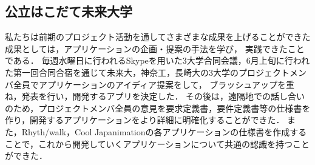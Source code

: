 \subsection{公立はこだて未来大学}
\par
私たちは前期のプロジェクト活動を通してさまざまな成果を上げることができた成果としては，アプリケーションの企画・提案の手法を学び， 実践できたことである．
毎週水曜日に行われるSkypeを用いた3大学合同会議，6月上旬に行われた第一回合同合宿を通じて未来大，神奈工，長崎大の3大学のプロジェクトメンバ全員でアプリケーションのアイディア提案をして， ブラッシュアップを重ね，発表を行い，開発するアプリを決定した．
その後は，遠隔地での話し合いのため，プロジェクトメンバ全員の意見を要求定義書，要件定義書等の仕様書を作り，開発するアプリケーションをより詳細に明確化することができた．
また，Rhyth/walk，Cool Japanimationの各アプリケーションの仕様書を作成することで，これから開発していくアプリケーションについて共通の認識を持つことができた．

